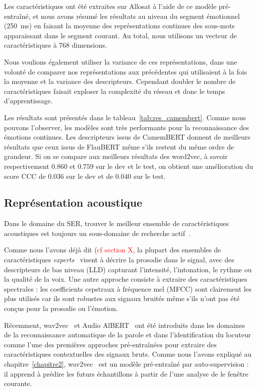 Les caractéristiques ont été extraites sur Allosat à l'aide de ce modèle pré-entraîné, et nous avons résumé les résultats au niveau du segment émotionnel (250~ms) en faisant la moyenne des représentations continues des sous-mots apparaissant dans le segment courant. Au total, nous utilisons un vecteur de caractéristiques à 768 dimensions.

Nous voulions également utiliser la variance de ces représentations, dans une volonté de comparer nos représentations aux précédentes qui utilisaient à la fois la moyenne et la variance des descripteurs. Cependant doubler le nombre de caractéristiques faisait exploser la complexité du réseau et donc le temps d'apprentissage.

Les résultats sont présentés dans le tableau~\ref{tab:res_camembert}. Comme nous pouvons l'observer, les modèles sont très performants pour la reconnaissance des émotions continues. Les descripteurs issus de CamemBERT donnent de meilleurs résultats que ceux issus de FlauBERT même s'ils restent du même ordre de grandeur. Si on se compare aux meilleurs résultats des word2vec, à savoir respectivement $0.860$ et $0.759$ sur le dev et le test, on obtient une amélioration du score CCC de 0$.036$ sur le dev et de $0.040$ sur le test.



\subsection{Représentation acoustique}
Dans le domaine du SER, trouver le meilleur ensemble de caractéristiques acoustiques est toujours un sous-domaine de recherche actif~\cite{Jing2018}.

Comme nous l'avons déjà dit (\textcolor{red}{cf section X}, la plupart des ensembles de caractéristiques \textit{experts}~\cite{Eyben2016,Schuller2013} visent à décrire la prosodie dans le signal, avec des descripteurs de bas niveau (LLD) capturant l'intensité, l'intonation, le rythme ou la qualité de la voix.
Une autre approche consiste à extraire des caractéristiques spectrales : les coefficients cepstraux à fréquence mel (MFCC) sont clairement les plus utilisés car ils sont robustes aux signaux bruités même s'ils n'ont pas été conçus pour la prosodie ou l'émotion.

Récemment, wav2vec~\cite{Schneider2019} et Audio AlBERT~\cite{Chi2020} ont été introduits dans les domaines de la reconnaissance automatique de la parole et dans l'identification du locuteur comme l'une des premières approches pré-entraînées pour extraire des caractéristiques contextuelles des signaux bruts.
Comme nous l'avons expliqué au chapitre~\ref{chapitre2}, wav2vec~\cite{Schneider2019} est un modèle pré-entraîné par auto-supervision : il apprend à prédire les futurs échantillons à partir de l'une analyse de le fenêtre courante.

